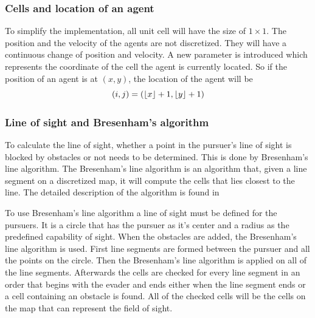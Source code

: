 \documentclass[ebook,11pt] {kth-mag}
\DeclarePairedDelimiter\floor{\lfloor}{\rfloor}
\begin{document}
\subsubsection{Cells and location of an agent}
To simplify the implementation, all unit cell will have the size of $1\times 1$. The position and the velocity of the agents are not discretized. They will have a continuous change of position and velocity. A new parameter is introduced which represents the coordinate of the cell the agent is currently located. So if the position of an agent is at $(x,y)$, the location of the agent will be
$$
(i,j) = (\floor*{x}+1, \floor*{y}+1)
$$

\subsubsection{Line of sight and Bresenham's algorithm}
To calculate the line of sight, whether a point in the pursuer's line of sight is blocked by obstacles or not needs to be determined. This is done by Bresenham's line algorithm. The Bresenham's line algorithm is an algorithm that, given a line segment on a discretized map, it will compute the cells that lies closest to the line. The detailed description of the algorithm is found in \cite{line} 


To use Bresenham's line algorithm a line of sight must be defined for the pursuers. It is a circle that has the pursuer as it's center and a radius as the predefined capability of sight. When the obstacles are added, the Bresenham's line algorithm is used. First line segments are formed between the pursuer and all the points on the circle. Then the Bresenham's line algorithm is applied on all of the line segments. Afterwards the cells are checked for every line segment in an order that begins with the evader and ends either when the line segment ends or a cell containing an obstacle is found. All of the checked cells will be the cells on the map that can represent the field of sight. 
\end{document}
